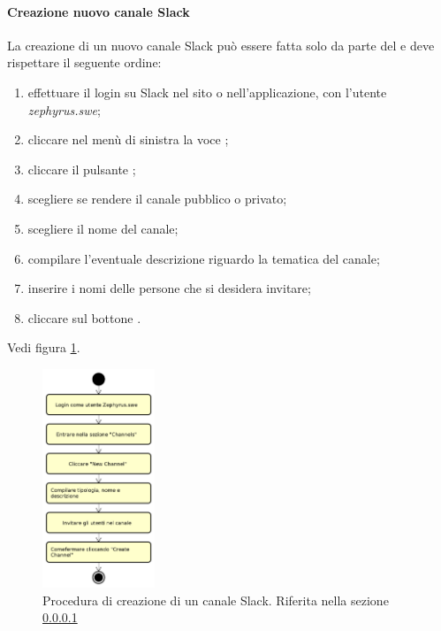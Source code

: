        	\paragraph{Creazione nuovo canale Slack}\label{sec:CreaCanale}
		La creazione di un nuovo canale Slack può essere fatta solo da parte del \responsabile{} e deve rispettare il seguente ordine:
		\begin{enumerate}
			\item effettuare il login su Slack nel sito o nell'applicazione, con l'utente \textit{zephyrus.swe};
			\item cliccare nel menù di sinistra la voce ;
			\item cliccare il pulsante ;
			\item scegliere se rendere il canale pubblico o privato;
			\item scegliere il nome del canale;
			\item compilare l'eventuale descrizione riguardo la tematica del canale;
			\item inserire i nomi delle persone che si desidera invitare;
			\item cliccare sul bottone .
		\end{enumerate}
		Vedi figura \ref{fig:ProCreaCanale}.
		\begin{figure}[h!]
			\centering
			\includegraphics[width=0.3\textwidth]{img/CreazioneCanaleSlack}
			\caption{Procedura di creazione di un canale Slack. Riferita nella sezione \ref{sec:CreaCanale}}
			\label{fig:ProCreaCanale}
		\end{figure}\mbox{}\\
